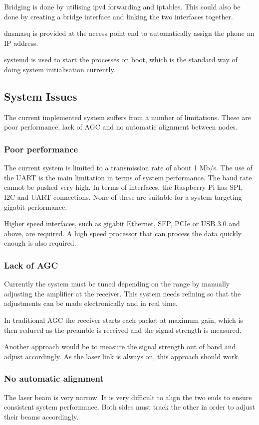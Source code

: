 Bridging is done by utilising ipv4 forwarding and iptables. This could also
be done by creating a bridge interface and linking the two interfaces together.

dnsmasq is provided at the access point end to automatically assign the phone
an IP address.

systemd is used to start the processes on boot, which is the standard way
of doing system initialisation currently.

\subsection{System Issues}
The current implemented system suffers from a number of limitations. These are
poor performance, lack of \ac{AGC} and no automatic alignment between nodes.

\subsubsection{Poor performance}
The current system is limited to a transmission rate of about 1 Mb/s. The use
of the \ac{UART} is the main limitation in terms of system performance. The baud
rate cannot be pushed very high. In terms of interfaces, the Raspberry Pi has
\ac{SPI}, \ac{I2C} and \ac{UART} connections. None of these are suitable for
a system targeting gigabit performance.

Higher speed interfaces, such as gigabit Ethernet, \ac{SFP}, \ac{PCIe} or
\ac{USB} 3.0 and above, are required. A high speed processor that can process
the data quickly enough is also required.

\subsubsection{Lack of \ac{AGC}}
Currently the system must be tuned depending on the range by manually
adjusting the amplifier at the receiver. This system needs refining so that
the adjustments can be made electronically and in real time.

In traditional \ac{AGC} the receiver starts each packet at maximum gain,
which is then reduced as the preamble is received and the signal strength
is measured.

Another approach would be to measure the signal strength out of band and
adjust accordingly. As the laser link is always on, this approach should work.

\subsubsection{No automatic alignment}
The laser beam is very narrow. It is very difficult to align the two ends
to ensure consistent system performance. Both sides must track the other in
order to adjust their beams accordingly.

